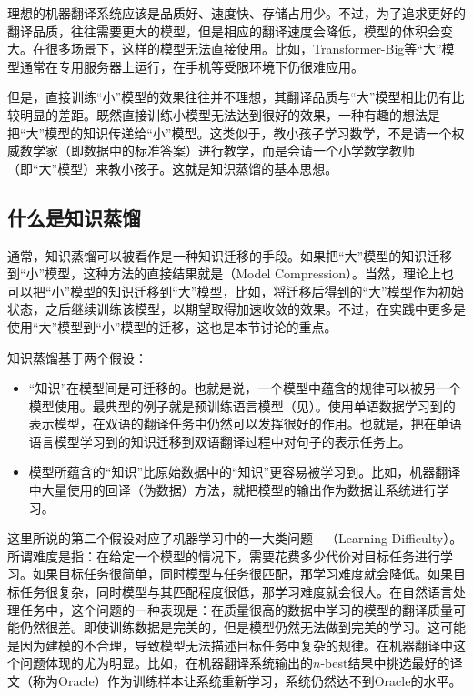 \parinterval 理想的机器翻译系统应该是品质好、速度快、存储占用少。不过，为了追求更好的翻译品质，往往需要更大的模型，但是相应的翻译速度会降低，模型的体积会变大。在很多场景下，这样的模型无法直接使用。比如，Transformer-Big等“大”模型通常在专用服务器上运行，在手机等受限环境下仍很难应用。

\parinterval 但是，直接训练“小”模型的效果往往并不理想，其翻译品质与“大”模型相比仍有比较明显的差距。既然直接训练小模型无法达到很好的效果，一种有趣的想法是把“大”模型的知识传递给“小”模型。这类似于，教小孩子学习数学，不是请一个权威数学家（即数据中的标准答案）进行教学，而是会请一个小学数学教师（即“大”模型）来教小孩子。这就是知识蒸馏的基本思想。


\subsection{什么是知识蒸馏}

\parinterval 通常，知识蒸馏可以被看作是一种知识迁移的手段。如果把“大”模型的知识迁移到“小”模型，这种方法的直接结果就是{\small{}}（Model Compression）。当然，理论上也可以把“小”模型的知识迁移到“大”模型，比如，将迁移后得到的“大”模型作为初始状态，之后继续训练该模型，以期望取得加速收敛的效果。不过，在实践中更多是使用“大”模型到“小”模型的迁移，这也是本节讨论的重点。

\parinterval 知识蒸馏基于两个假设：

\begin{itemize}
\vspace{0.5em}
\item “知识”在模型间是可迁移的。也就是说，一个模型中蕴含的规律可以被另一个模型使用。最典型的例子就是预训练语言模型（见{\chapternine}）。使用单语数据学习到的表示模型，在双语的翻译任务中仍然可以发挥很好的作用。也就是，把在单语语言模型学习到的知识迁移到双语翻译过程中对句子的表示任务上。
\vspace{0.5em}
\item 模型所蕴含的“知识”比原始数据中的“知识”更容易被学习到。比如，机器翻译中大量使用的回译（伪数据）方法，就把模型的输出作为数据让系统进行学习。
\vspace{0.5em}
\end{itemize}

\parinterval 这里所说的第二个假设对应了机器学习中的一大类问题\ \dash \ {\small{}}（Learning Difficulty）。所谓难度是指：在给定一个模型的情况下，需要花费多少代价对目标任务进行学习。如果目标任务很简单，同时模型与任务很匹配，那学习难度就会降低。如果目标任务很复杂，同时模型与其匹配程度很低，那学习难度就会很大。在自然语言处理任务中，这个问题的一种表现是：在质量很高的数据中学习的模型的翻译质量可能仍然很差。即使训练数据是完美的，但是模型仍然无法做到完美的学习。这可能是因为建模的不合理，导致模型无法描述目标任务中复杂的规律。在机器翻译中这个问题体现的尤为明显。比如，在机器翻译系统输出的$n$-best结果中挑选最好的译文（称为Oracle）作为训练样本让系统重新学习，系统仍然达不到Oracle的水平。

